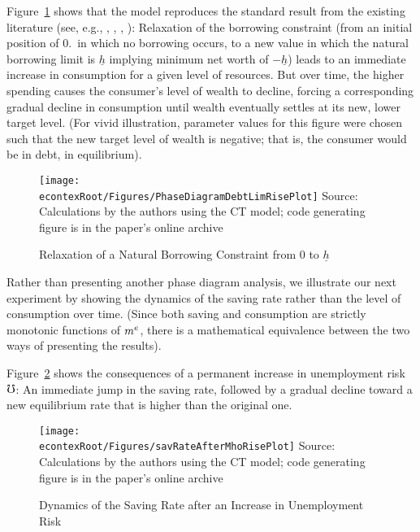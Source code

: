 \documentclass[titlepage]{\econtex}
\begin{document}
Figure~\ref{fig:PhaseDiagramDebtLimRise} shows that the model reproduces the standard result from the existing literature (see, e.g., \cite{carroll:atheoryjep}, \cite{mue07}, \cite{glLiq}, \cite{hall:slump}): Relaxation of the borrowing constraint (from an initial position of 0.\ in which no borrowing occurs, to a new value in which the natural borrowing limit is $\underline{h}$ implying minimum net worth of $-\underline{h}$) leads to an immediate increase in consumption for a given level of resources.  But over time, the higher spending causes the consumer's level of wealth to decline, forcing a corresponding gradual decline in consumption until wealth eventually settles at its new, lower target level.  (For vivid illustration, parameter values for this figure were chosen such that
the new target level of wealth is negative; that is, the consumer would be in debt, in equilibrium).

\begin{figure}
\caption{Relaxation of a Natural Borrowing Constraint from 0 to $\underline{h}$}
\texttt{[image: \\econtexRoot/Figures/PhaseDiagramDebtLimRisePlot]}
\label{fig:PhaseDiagramDebtLimRise}
\tiny Source: Calculations by the authors using the CT  model; code generating figure is in the paper's online archive
\end{figure}

Rather than presenting another phase diagram analysis, we
illustrate our next experiment by showing the dynamics of the
saving rate rather than the level of consumption over time.  (Since
both saving and consumption are strictly monotonic functions of $m^{e}$,
there is a mathematical equivalence between the two ways of presenting
the results).

Figure~\ref{fig:savRateAfterMhoRisePlot} shows the consequences of a
permanent increase in unemployment risk $\mho$: An immediate jump in
the saving rate, followed by a gradual decline toward a new
equilibrium rate that is higher than the original one.


\begin{figure}
\caption{Dynamics of the Saving Rate after an Increase in Unemployment Risk}
\texttt{[image: \\econtexRoot/Figures/savRateAfterMhoRisePlot]}
\label{fig:savRateAfterMhoRisePlot}
\tiny Source: Calculations by the authors using the CT model; code generating figure is in the paper's online archive
\end{figure}
\end{document}
